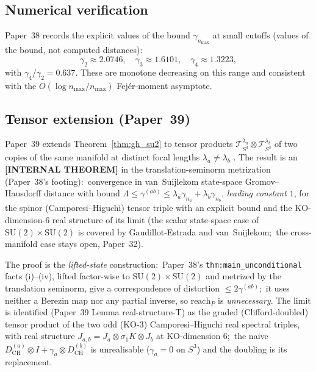 \documentclass[11pt,a4paper]{article}
\theoremstyle{plain}
\theoremstyle{definition}
\newcommand{\nmax}{n_{\max}}
\newcommand{\sthree}{S^{3}}
\newcommand{\DCH}{D_{\mathrm{CH}}}
\newcommand{\Tcal}{\mathcal{T}}
\newcommand{\SU}{\mathrm{SU}}
\newcommand{\gvc}[2]{#2}
\begin{document}
\subsection{Numerical verification}

Paper~38 records the explicit values of the bound $\gamma_{\nmax}$ at
small cutoffs (values of the bound, not computed distances):
\begin{equation}
\gamma_{2} \approx 2.0746,
\quad
\gamma_{3} \approx 1.6101,
\quad
\gamma_{4} \approx 1.3223,
\label{eq:numerical_lambda}
\end{equation}
with $\gamma_{4}/\gamma_{2} = 0.637$.  These are monotone decreasing
on this range and consistent with the $O(\log \nmax / \nmax)$ Fej\'er-moment asymptote.

\subsection{Tensor extension (Paper~39)}
\label{sec:tensor_extension}

Paper~39 extends Theorem~\ref{thm:gh_su2} to tensor products
$\Tcal_{\sthree}^{\lambda_{a}} \otimes \Tcal_{\sthree}^{\lambda_{b}}$
of two copies of the same manifold at distinct focal lengths
$\lambda_{a} \ne \lambda_{b}$ \cite{paper39}.  The result is an
\textbf{[INTERNAL THEOREM]} in the translation-seminorm metrization
(Paper~38's footing):\ \gvc{p39-state-space-not-propinquity}{convergence in van~Suijlekom state-space
Gromov--Hausdorff distance with bound
$\Lambda \le \gamma^{(ab)} \le \lambda_a\gamma_{n_a} +
\lambda_b\gamma_{n_b}$, \emph{leading constant $1$}}, for the spinor
(Camporesi--Higuchi) tensor triple with an explicit bound and the
KO-dimension-6 real structure of its limit (the scalar state-space case
of $\SU(2)\times\SU(2)$ is covered by Gaudillot-Estrada and
van~Suijlekom;\ the cross-manifold case stays open, Paper~32).

The proof is the \emph{lifted-state} construction:\ Paper~38's
\texttt{thm:main\_unconditional} facts (i)--(iv), lifted factor-wise to
$\SU(2)\times\SU(2)$ and metrized by the translation seminorm, give a
correspondence of distortion $\le 2\gamma^{(ab)}$;\ it uses neither a
Berezin map nor any partial inverse, so $\mathrm{reach}_P$ is
\emph{unnecessary}. The limit is identified (Paper~39 Lemma
real-structure-T) as the graded (Clifford-doubled) tensor product of the
two odd (KO-3) Camporesi--Higuchi real spectral triples, with real
structure $J_{a,b} = J_a \otimes \sigma_1 K \otimes J_b$ at KO-dimension
$6$;\ the naive $\DCH^{(a)}\otimes I + \gamma_a\otimes\DCH^{(b)}$ is
unrealisable ($\gamma_a = 0$ on $\sthree$) and the doubling is its
replacement.
\end{document}
